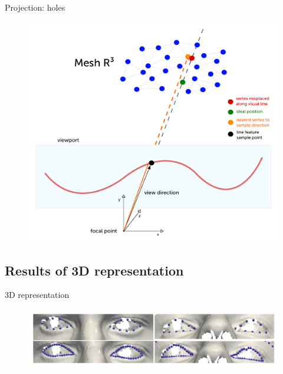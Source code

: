 \documentclass[xcolor=x11names,compress]{beamer}
\begin{document}
    \begin{frame}{Projection: holes}
        \begin{figure}
            \centering
            \includegraphics[width=.8\textwidth]{../resources/figures/projection_holes.pdf}
        \end{figure}
    \end{frame}


    \subsection{Results of 3D representation}
    \begin{frame}{3D representation}
         \begin{figure}
            \centering
            \includegraphics[width=\textwidth]{../resources/img/linefeatures_eyes.pdf}
        \end{figure}
    \end{frame}
\end{document}
